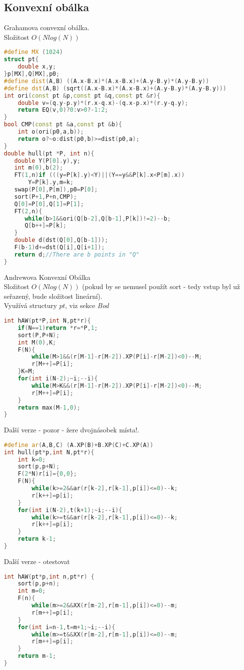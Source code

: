 \documentclass[11pt]{article}
\begin{document}
\subsection{Konvexní obálka}
Grahamova convexní obálka.
\\Složitost $O(Nlog(N))$
\begin{lstlisting}[language=C++]
#define MX (1024)
struct pt{
    double x,y;
}p[MX],Q[MX],p0;
#define dist(A,B) ((A.x-B.x)*(A.x-B.x)+(A.y-B.y)*(A.y-B.y))
#define dst(A,B) (sqrt((A.x-B.x)*(A.x-B.x)+(A.y-B.y)*(A.y-B.y)))
int ori(const pt &p,const pt &q,const pt &r){
    double v=(q.y-p.y)*(r.x-q.x)-(q.x-p.x)*(r.y-q.y);
    return EQ(v,0)?0:v>0?-1:2;
}
bool CMP(const pt &a,const pt &b){
    int o(ori(p0,a,b));
    return o?~o:dist(p0,b)>=dist(p0,a);
}
double hull(pt *P, int n){
   double Y(P[0].y),y;
   int m(0),b(2);
   FT(1,n)if (((y=P[k].y)<Y)||(Y==y&&P[k].x<P[m].x))
       Y=P[k].y,m=k;
   swap(P[0],P[m]),p0=P[0];
   sort(P+1,P+n,CMP);
   Q[0]=P[0],Q[1]=P[1];
   FT(2,n){
      while(b>1&&ori(Q[b-2],Q[b-1],P[k])!=2)--b;
      Q[b++]=P[k];
   }
   double d(dst(Q[0],Q[b-1]));
   F(b-1)d+=dst(Q[i],Q[i+1]);
   return d;//There are b points in "Q"
}
\end{lstlisting}
Andrewova Konvexní Obálka
\\Složitost $O(Nlog(N))$ (pokud by se nemusel použít sort - tedy vstup byl už seřazený, bude složitost lineární).
\\Využívá structury $pt$, viz sekce \textit{Bod}
\begin{lstlisting}[language=C++]
int hAW(pt*P,int N,pt*r){
	if(N==1)return *r=*P,1;
    sort(P,P+N);
    int M(0),K;
    F(N){
        while(M>1&&(r[M-1]-r[M-2]).XP(P[i]-r[M-2])<0)--M;
        r[M++]=P[i];
    }K=M;
    for(int i(N-2);~i;--i){
        while(M>K&&(r[M-1]-r[M-2]).XP(P[i]-r[M-2])<0)--M;
        r[M++]=P[i];
    }
    return max(M-1,0);
}
\end{lstlisting}
Další verze - pozor - žere dvojnásobek místa!.
\begin{lstlisting}[language=C++]
#define ar(A,B,C) (A.XP(B)+B.XP(C)+C.XP(A))
int hull(pt*p,int N,pt*r){
    int k=0;
    sort(p,p+N);
    F(2*N)r[i]={0,0};
    F(N){
        while(k>=2&&ar(r[k-2],r[k-1],p[i])<=0)--k;
        r[k++]=p[i];
    }
    for(int i(N-2),t(k+1);~i;--i){
        while(k>=t&&ar(r[k-2],r[k-1],p[i])<=0)--k;
        r[k++]=p[i];
    }
    return k-1;
}
\end{lstlisting}
Další verze - otestovat
\begin{lstlisting}[language=C++]
int hAW(pt*p,int n,pt*r) {
    sort(p,p+n);
    int m=0;
    F(n){
        while(m>=2&&XX(r[m-2],r[m-1],p[i])<=0)--m;
        r[m++]=p[i];
    }
    for(int i=n-1,t=m+1;~i;--i){
        while(m>=t&&XX(r[m-2],r[m-1],p[i])<=0)--m;
        r[m++]=p[i];
    }
    return m-1;
}
\end{lstlisting}
\end{document}
